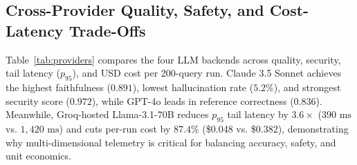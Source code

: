 \documentclass[conference]{IEEEtran}
\begin{document}
\begin{table}[!t]
\centering
\caption{Cross-Provider RAG Quality, Guardrail Resilience, Tail Latency, and Token Cost Comparison ($N=200$ Queries)}
\label{tab:providers}
\renewcommand{\arraystretch}{1.15}
\end{table}

\subsection{Cross-Provider Quality, Safety, and Cost-Latency Trade-Offs}
Table~\ref{tab:providers} compares the four LLM backends across quality, security, tail latency ($p_{95}$), and USD cost per 200-query run. Claude 3.5 Sonnet achieves the highest faithfulness ($0.891$), lowest hallucination rate ($5.2\%$), and strongest security score ($0.972$), while GPT-4o leads in reference correctness ($0.836$). Meanwhile, Groq-hosted Llama-3.1-70B reduces $p_{95}$ tail latency by $3.6\times$ ($390\text{ ms}$ vs. $1,420\text{ ms}$) and cuts per-run cost by $87.4\%$ (\$0.048 vs. \$0.382), demonstrating why multi-dimensional telemetry is critical for balancing accuracy, safety, and unit economics.
\end{document}
